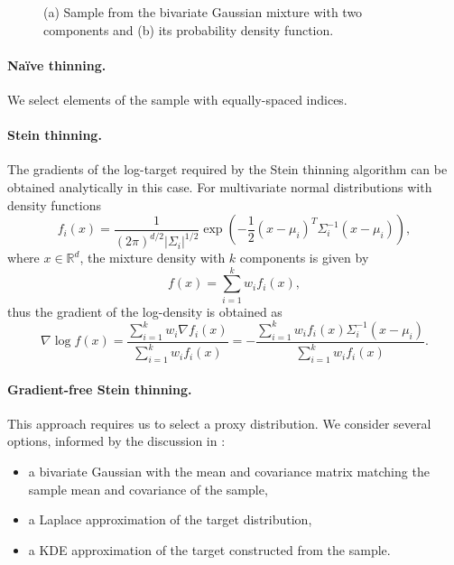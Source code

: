 \documentclass[11pt,a4paper]{report}
\begin{document}
\begin{figure}[h]
\centering
{}
\caption{(a) Sample from the bivariate Gaussian mixture with two components and (b) its probability density function.
\label{fig:gmm:sample}}
\end{figure}

\paragraph{Na\"ive thinning.} We select elements of the sample with equally-spaced indices.

\paragraph{Stein thinning.} The gradients of the log-target required by the Stein thinning algorithm can be obtained analytically in this case. For multivariate normal distributions with density functions
$$f_i(x) = \frac{1}{(2\pi)^{d/2} |\Sigma_i|^{1/2}}\exp\left(-\frac{1}{2}(x - \mu_i)^T \Sigma_i^{-1}(x-\mu_i)\right),$$
where $x \in \mathbb{R}^d$, the mixture density with $k$ components is given by
$$f(x) = \sum_{i=1}^k w_i f_i(x),$$
thus the gradient of the log-density is obtained as
$$\nabla \log f(x) = \frac{\sum_{i=1}^k w_i \nabla f_i(x)}{\sum_{i=1}^k w_i f_i(x)} = -\frac{\sum_{i=1}^k w_i f_i(x) \Sigma_i^{-1}(x - \mu_i)}{\sum_{i=1}^k w_i f_i(x)}.$$

\paragraph{Gradient-free Stein thinning.} This approach requires us to select a proxy distribution. We consider several options, informed by the discussion in \cite{fisherGradientFreeKernelStein2024}:
\begin{itemize}
\item a bivariate Gaussian with the mean and covariance matrix matching the sample mean and covariance of the sample,
\item a Laplace approximation of the target distribution,
\item a KDE approximation of the target constructed from the sample.
\end{itemize}
\end{document}
